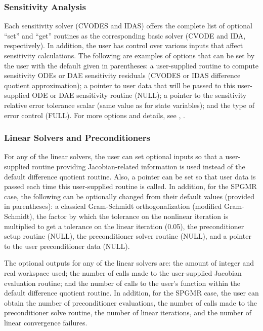 \subsubsection*{Sensitivity Analysis}

Each sensitivity solver (CVODES and IDAS) offers the complete list of
optional ``set'' and ``get'' routines as the corresponding basic solver (CVODE
and IDA, respectively). In addition, the user has control over various
inputs that affect sensitivity calculations. 
The following are examples of options that can be set by the user
with the default given in parentheses: a user-supplied routine
to compute sensitivity ODEs or DAE sensitivity residuals (CVODES or
IDAS difference quotient approximation); a pointer to user data that
will be passed to this user-supplied ODE or DAE sensitivity routine (NULL); a
pointer to the sensitivity relative error tolerance scalar (same value as
for state variables); and the type of error control (FULL).
For more options and details, see \cite{SeHi:03}, \cite{HiSe:02}.

\subsubsection*{Linear Solvers and Preconditioners}

For any of the linear solvers, the user can set optional inputs so 
that a user-supplied routine providing Jacobian-related information
is used instead of the default difference quotient routine. 
Also, a pointer can be set so that user data is passed each time this
user-supplied routine is called. In addition, for the SPGMR case,
the following can be optionally changed from their default values
(provided in parentheses): a classical Gram-Schmidt orthogonalization 
(modified Gram-Schmidt), the factor by which the tolerance on the
nonlinear iteration is multiplied to get a tolerance on the linear
iteration (0.05), the preconditioner setup routine (NULL), the
preconditioner solver routine (NULL), and a pointer to the user
preconditioner data (NULL).

The optional outputs for any of the linear solvers are: the amount of 
integer and real workspace used; the number of calls made to the user-supplied 
Jacobian evaluation routine; and the number of calls to the user's function 
within the default difference quotient routine.
In addition, for the SPGMR case, the user can obtain the number of preconditioner
evaluations, the number of calls made to the preconditioner solve
routine, the number of linear iterations, and the number of linear
convergence failures.

